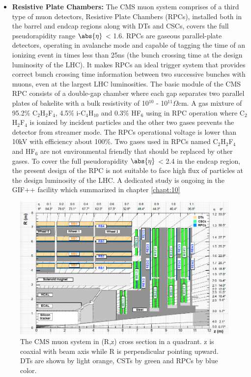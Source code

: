 \begin{itemize}
\item{\textbf{Resistive Plate Chambers:}}
The CMS muon system comprises of a third type of muon detectors, Resistive Plate Chambers (RPCs), installed both in the barrel and endcap regions along with DTs and CSCs, covers the full pseudorapidity range $\abs{\eta}$ < 1.6. RPCs are gaseous parallel-plate detectors, operating in avalanche mode and capable of tagging the time of an ionizing event in times less than 25ns (the bunch crossing time at the design luminosity of the LHC). It makes RPCs an ideal trigger system that provides correct bunch crossing time information between two successive bunches with muons, even at the largest LHC luminosities.
The basic module of the CMS RPC consists of a double-gap chamber where each gap separates two parallel plates of bakelite with a bulk resistivity of 10$^{10}$ - 10$^{11}\Omega$cm. A gas mixture of 95.2\% C$_{2}$H$_{2}$F$_{4}$, 4.5\% i-C$_{4}$H$_{10}$ and 0.3\% HF$_{6}$ using in RPC operation where C$_{2}$H$_{2}$F$_{4}$ is ionized by incident particles and the other two gases prevents the detector from streamer mode. The RPCs operational voltage is lower than 10kV with efficiency about 100\%. Two gases used in RPCs named C$_{2}$H$_{2}$F$_{4}$ and HF$_{6}$ are not environmental friendly that should be replaced by other gases. To cover the full pseudorapidity $\abs{\eta}$ < 2.4 in the endcap region, the present design of the RPC is not suitable to face high flux of particles at the design luminosity of the LHC. A dedicated study is ongoing in the GIF++ facility which summarized in chapter \ref{chapt:10}  
\end{itemize}
\begin{figure}[h]
\centering
\includegraphics[scale=0.63]{fig/chapt3/muon_detectors.png}
\caption{\label{fig:rpc_dt} The CMS muon system in (R,z) cross section in a quadrant. z is coaxial with beam axis while R is perpendicular pointing upward. DTs are shown by light orange, CSTs by green and RPCs by blue color.}
\end{figure}

